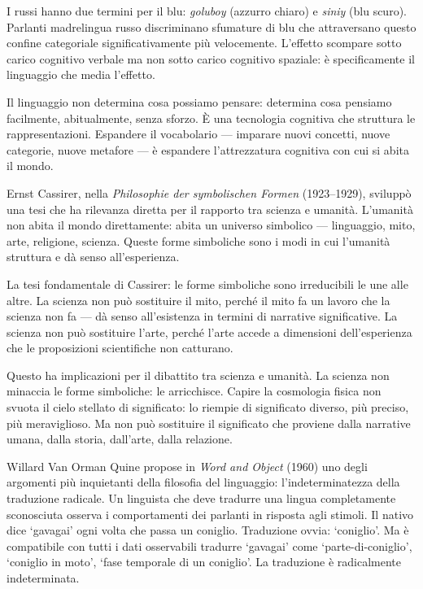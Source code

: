 \documentclass[12pt,a4paper,openany]{book}
\newcommand{\sezione}[1]{\vspace{1.2em}{\large\bfseries #1}\vspace{0.5em}\par}
\begin{document}
I russi hanno due termini per il blu: \textit{goluboy} (azzurro chiaro) e \textit{siniy} (blu scuro). Parlanti madrelingua russo discriminano sfumature di blu che attraversano questo confine categoriale significativamente più velocemente. L'effetto scompare sotto carico cognitivo verbale ma non sotto carico cognitivo spaziale: è specificamente il linguaggio che media l'effetto.

Il linguaggio non determina cosa possiamo pensare: determina cosa pensiamo facilmente, abitualmente, senza sforzo. È una tecnologia cognitiva che struttura le rappresentazioni. Espandere il vocabolario — imparare nuovi concetti, nuove categorie, nuove metafore — è espandere l'attrezzatura cognitiva con cui si abita il mondo.

\sezione{Cassirer e le forme simboliche}

Ernst Cassirer, nella \textit{Philosophie der symbolischen Formen} (1923--1929), sviluppò una tesi che ha rilevanza diretta per il rapporto tra scienza e umanità. L'umanità non abita il mondo direttamente: abita un universo simbolico — linguaggio, mito, arte, religione, scienza. Queste forme simboliche sono i modi in cui l'umanità struttura e dà senso all'esperienza.

La tesi fondamentale di Cassirer: le forme simboliche sono irreducibili le une alle altre. La scienza non può sostituire il mito, perché il mito fa un lavoro che la scienza non fa — dà senso all'esistenza in termini di narrative significative. La scienza non può sostituire l'arte, perché l'arte accede a dimensioni dell'esperienza che le proposizioni scientifiche non catturano.

Questo ha implicazioni per il dibattito tra scienza e umanità. La scienza non minaccia le forme simboliche: le arricchisce. Capire la cosmologia fisica non svuota il cielo stellato di significato: lo riempie di significato diverso, più preciso, più meraviglioso. Ma non può sostituire il significato che proviene dalla narrative umana, dalla storia, dall'arte, dalla relazione.

\sezione{Quine e l'indeterminatezza della traduzione}

Willard Van Orman Quine propose in \textit{Word and Object} (1960) uno degli argomenti più inquietanti della filosofia del linguaggio: l'indeterminatezza della traduzione radicale. Un linguista che deve tradurre una lingua completamente sconosciuta osserva i comportamenti dei parlanti in risposta agli stimoli. Il nativo dice `gavagai' ogni volta che passa un coniglio. Traduzione ovvia: `coniglio'. Ma è compatibile con tutti i dati osservabili tradurre `gavagai' come `parte-di-coniglio', `coniglio in moto', `fase temporale di un coniglio'. La traduzione è radicalmente indeterminata.
\end{document}
